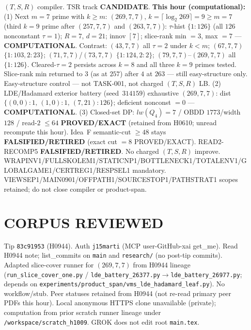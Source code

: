 \documentclass[11pt]{article}
\begin{document}
$(T,S,R)$ compiler. TSR track \textbf{CANDIDATE}.
\textbf{This hour (computational):}
(1) Next $m{=}7$ prime with $k{\ge}m$: $(269,7,7)$, $k=\lceil\log_2 269\rceil=9{\ge}m{=}7$
(third $k{=}9$ prime after $(257,7,7)$ and $(263,7,7)$):
$\tau$-hist $\{1{:}126\}$ (all $126$ nonconstant $\tau{=}1$); $R{=}7$, $d{=}21$; innov $[7]$;
slice-rank min $=3$, max $=7$ --- \textbf{COMPUTATIONAL}.
Contrast: $(43,7,7)$ all $\tau{=}2$ under $k{<}m$; $(67,7,7)$ $\{1{:}103,2{:}23\}$;
$(71,7,7)$/$(73,7,7)$ $\{1{:}124,2{:}2\}$; $(79,7,7)$--$(269,7,7)$ all $\{1{:}126\}$.
Cleared-$\tau{=}2$ persists across $k{=}8$ and all three $k{=}9$ primes tested.
Slice-rank min returned to $3$ (as at $257$) after $4$ at $263$ --- still easy-structure only.
Easy-structure control --- not TASK-001, not charged $(T,S,R)$ LB.
(2) LDE/Hadamard exterior battery (seed~$314159$) exhaustive $(269,7,7)$:
dist $\{(0,0){:}1,\,(1,0){:}1,\,(7,21){:}126\}$; deficient nonconst $=0$ --- \textbf{COMPUTATIONAL}.
(3) Closed-set DP: $lw(Q_4)=7$ / OBDD $1773$/width $128$ / read-$2$ $\le64$
\textbf{PROVED/EXACT} (retained from H0610; unread recompute this hour).
Idea~F semantic-cut $\ge48$ stays \textbf{FALSIFIED/RETIRED} (exact cut $=8$ PROVED/EXACT).
READ2-RECOMP5 \textbf{FALSIFIED/RETIRED}. No charged $(T,S,R)$ improve.
WRAPINV1/FULLSKOLEM1/STATICNP1/BOTTLENECK1/TOTALENV1/GLOBALGAME1/CERTREG1/RESPSEL1 mandatory.
VIEWSEP1/MAIN0901/OFFPATH1/SOURCESTOP1/PATHSTRAT1 scopes retained; do not close compiler or product-span.

\section*{CORPUS REVIEWED}
Tip \texttt{83c91953} (H0944). Auth \texttt{j15marti} (MCP user-GitHub-xai get\_me).
Read H0944 note; list\_commits on \texttt{main} and \texttt{research/} (no post-tip commits).
Adapted slice-cover runner for $(269,7,7)$ from H0944 lineage
(\texttt{run\_slice\_cover\_one.py} / \texttt{lde\_battery\_26377.py}$\to$\texttt{lde\_battery\_26977.py};
depends on \texttt{experiments/product\_span/vms\_lde\_hadamard\_leaf.py}).
No workflow/stub. Peer statuses retained from H0944 (not re-read primary peer PDFs this hour).
Local anonymous HTTPS clone unavailable (private);
computation from prior scratch runner lineage under \texttt{/workspace/scratch\_h1009}.
GROK does not edit root \texttt{main.tex}.
\end{document}
